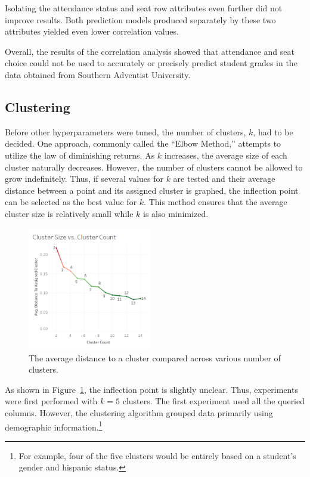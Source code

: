 Isolating the attendance status and seat row attributes even further did not improve results. Both prediction models produced separately by these two attributes yielded even lower correlation values.

Overall, the results of the correlation analysis showed that attendance and seat choice could not be used to accurately or precisely predict student grades in the data obtained from Southern Adventist University.

\subsection{Clustering}
Before other hyperparameters were tuned, the number of clusters, $k$, had to be decided. One approach, commonly called the ``Elbow Method,'' attempts to utilize the law of diminishing returns. As $k$ increases, the average size of each cluster naturally decreases. However, the number of clusters cannot be allowed to grow indefinitely. Thus, if several values for $k$ are tested and their average distance between a point and its assigned cluster is graphed, the inflection point can be selected as the best value for $k$. This method ensures that the average cluster size is relatively small while $k$ is also minimized.

\begin{figure}[ht]
  \centering
	\includegraphics[width=0.48\textwidth]{figures/elbow.png}
	\caption{The average distance to a cluster compared across various number of clusters.}
	\label{fig:elbow}
\end{figure}

As shown in Figure~\ref{fig:elbow}, the inflection point is slightly unclear. Thus, experiments were first performed with $k=5$ clusters. The first experiment used all the queried columns. However, the clustering algorithm grouped data primarily using demographic information.\footnote{For example, four of the five clusters would be entirely based on a student's gender and hispanic status.}

